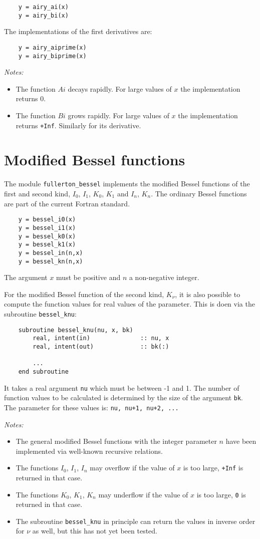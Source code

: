 \documentclass{article}
\begin{document}
\begin{verbatim}
    y = airy_ai(x)
    y = airy_bi(x)
\end{verbatim}

The implementations of the first derivatives are:

\begin{verbatim}
    y = airy_aiprime(x)
    y = airy_biprime(x)
\end{verbatim}

\emph{Notes:}
\begin{itemize}
\item
The function $Ai$ decays rapidly. For large values of $x$ the implementation returns 0.
\item
The function $Bi$ grows rapidly. For large values of $x$ the implementation returns \verb~+Inf~. Similarly for its derivative.
\end{itemize}


\section{Modified Bessel functions}
The module \verb+fullerton_bessel+ implements the modified Bessel functions of the first and second kind, $I_0$, $I_1$, $K_0$, $K_1$
and $I_n$, $K_n$. The ordinary Bessel functions are part of the current Fortran standard.

\begin{verbatim}
    y = bessel_i0(x)
    y = bessel_i1(x)
    y = bessel_k0(x)
    y = bessel_k1(x)
    y = bessel_in(n,x)
    y = bessel_kn(n,x)
\end{verbatim}
The argument $x$ must be positive and $n$ a non-negative integer.

For the modified Bessel function of the second kind, $K_\nu$, it is also possible to compute the
function values for real values of the parameter. This is doen via the subroutine \verb+bessel_knu+:
\begin{verbatim}
    subroutine bessel_knu(nu, x, bk)
        real, intent(in)              :: nu, x
        real, intent(out)             :: bk(:)

        ...
    end subroutine
\end{verbatim}
It takes a real argument \verb+nu+ which must be between -1 and 1. The number of function values to be calculated
is determined by the size of the argument \verb+bk+. The parameter for these values is:
\verb~nu, nu+1, nu+2, ...~

\emph{Notes:}
\begin{itemize}
\item
The general modified Bessel functions with the integer parameter $n$ have been implemented via
well-known recursive relations.
\item
The functions $I_0$, $I_1$, $I_n$ may overflow if the value of $x$ is too large, \verb~+Inf~ is returned in that case.
\item
The functions $K_0$, $K_1$, $K_n$ may underflow if the value of $x$ is too large, \verb~0~ is returned in that case.
\item
The subroutine \verb+bessel_knu+ in principle can return the values in inverse order for $\nu$ as well, but this
has not yet been tested.
\end{itemize}
\end{document}

